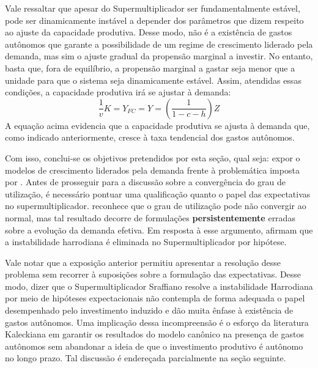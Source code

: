 Vale ressaltar que apesar do Supermultiplicador ser fundamentalmente estável, pode ser dinamicamente instável a depender dos parâmetros que dizem respeito ao ajuste da capacidade produtiva. Desse modo, não é a existência de gastos autônomos que garante a possibilidade de um regime de crescimento liderado pela demanda, mas sim o ajuste gradual da propensão marginal a investir. No entanto, basta que, fora de equilíbrio, a propensão marginal a gastar seja menor que a unidade para que o sistema seja dinamicamente estável. Assim, atendidas essas condições, a capacidade produtiva irá se ajustar à demanda:
$$
 \frac{1}{v}K = Y_{FC} = Y = \left(\frac{1}{1 - c - h}\right)Z
$$
A equação acima evidencia que a capacidade produtiva se ajusta à demanda que, como indicado anteriormente, cresce à taxa tendencial dos gastos autônomos.

Com isso, conclui-se os objetivos pretendidos por esta seção, qual seja: expor o modelos de crescimento liderados pela demanda frente à problemática imposta por \textcite{harrod_essay_1939}. Antes de prosseguir para a discussão sobre a convergência do grau de utilização, é necessário pontuar uma qualificação quanto o papel das expectativas no supermultiplicador. \textcite[p.~87]{serrano_long_1995} reconhece que o grau de utilização pode não convergir ao normal, mas tal resultado decorre de formulações \textbf{persistentemente} erradas sobre a evolução da demanda efetiva. Em resposta à esse argumento, \textcites{allain_macroeconomic_2014}{palley_economics_2018} afirmam que a instabilidade harrodiana é eliminada no Supermultiplicador por hipótese.

Vale notar que a exposição anterior permitiu apresentar a resolução desse problema sem recorrer à suposições sobre a formulação das expectativas. Desse modo, dizer que o Supermultiplicador Sraffiano resolve a instabilidade Harrodiana por meio de hipóteses expectacionais não contempla de forma adequada o papel desempenhado pelo investimento induzido e dão muita ênfase à existência de gastos autônomos. Uma implicação dessa incompreensão é o esforço da literatura Kaleckiana em garantir os resultados do modelo canônico na presença de gastos autônomos sem abandonar a ideia de que o investimento produtivo é autônomo no longo prazo. Tal discussão é endereçada parcialmente na seção seguinte.

